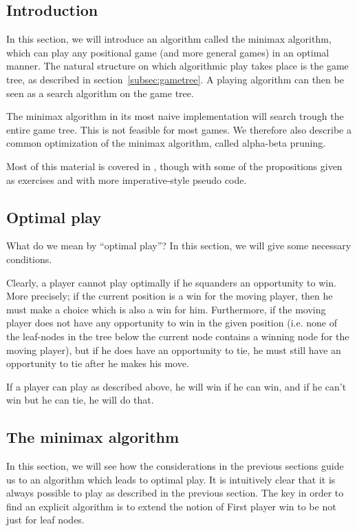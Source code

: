 \subsection{Introduction}

In this section, we will introduce an algorithm called the minimax algorithm, which can play any positional game (and more general games) in an optimal manner.
The natural structure on which algorithmic play takes place is the game tree, as described in section~\ref{subsec:gametree}.
A playing algorithm can then be seen as a search algorithm on the game tree.

The minimax algorithm in its most naive implementation will search trough the entire game tree. This is not feasible for most games.
We therefore also describe a common optimization of the minimax algorithm, called alpha-beta pruning.


Most of this material is covered in \citep{aimodernapproach}, though with some of the propositions given as exercises and with more imperative-style pseudo code.

\subsection{Optimal play}
\label{subsec:optimal_play}

What do we mean by ``optimal play''?
In this section, we will give some necessary conditions.

Clearly, a player cannot play optimally if he squanders an opportunity to win.
More precisely; if the current position is a win for the moving player, then he must make a choice which is also a win for him.
Furthermore, if the moving player does not have any opportunity to win in the given position (i.e. none of the leaf-nodes in the tree below the current node contains a winning node for the moving player), but if he does have an opportunity to tie, he must still have an opportunity to tie after he makes his move.

If a player can play as described above, he will win if he can win, and if he can't win but he can tie, he will do that.

\subsection{The minimax algorithm}
\label{sec:minimax}

In this section, we will see how the considerations in the previous sections guide us to an algorithm which leads to optimal play.
It is intuitively clear that it is always possible to play as described in the previous section.
The key in order to find an explicit algorithm is to extend the notion of First player win to be not just for leaf nodes.

